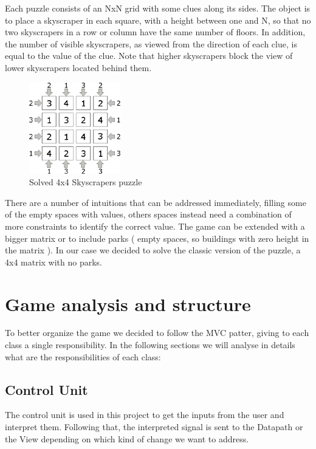 \documentclass[12pt]{report}
\begin{document}
Each puzzle consists of an NxN grid with some clues along its sides. The
object is to place a skyscraper in each square, with a height between one
and N, so that no two skyscrapers in a row or column have the same number
of floors. In addition, the number of visible skyscrapers, as viewed from
the direction of each clue, is equal to the value of the clue. Note that
higher skyscrapers block the view of lower skyscrapers located behind
them.

\begin{figure}[H]
  \centering
  \includegraphics[keepaspectratio]{images/skyscrapers_small_solved.jpg}
  \caption{Solved 4x4 Skyscrapers puzzle}
\end{figure}

There are a number of intuitions that can be addressed immediately,
filling some of the empty spaces with values, others spaces instead need
a combination of more constraints to identify the correct value. The game
can be extended with a bigger matrix or to include parks ( empty spaces, so
buildings with zero height in the matrix ). In our case we decided to
solve the classic version of the puzzle, a 4x4 matrix with no parks.

\chapter*{Game analysis and structure}

To better organize the game we decided to follow the MVC patter, giving to
each class a single responsibility. In the following sections we will
analyse in details what are the responsibilities of each class:

\newpage

\section*{Control Unit}

The control unit is used in this project to get the inputs from the user
and interpret them. Following that, the interpreted signal is sent to
the Datapath or the View depending on which kind of change we want to
address.
\end{document}
